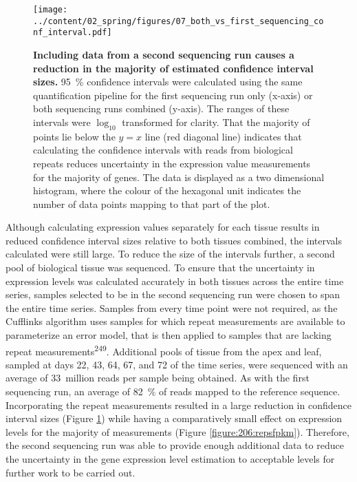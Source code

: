\documentclass[12pt,]{book}
\begin{document}
\begin{figure}[htbp]
\centering
\texttt{[image: ../content/02\_spring/figures/07\_both\_vs\_first\_sequencing\_conf\_interval.pdf]}
\caption{\textbf{Including data from a second sequencing run causes a
reduction in the majority of estimated confidence interval sizes.} 95~\%
confidence intervals were calculated using the same quantification
pipeline for the first sequencing run only (x-axis) or both sequencing
runs combined (y-axis). The ranges of these intervals were \(\log_{10}\)
transformed for clarity. That the majority of points lie below the
\(y = x\) line (red diagonal line) indicates that calculating the
confidence intervals with reads from biological repeats reduces
uncertainty in the expression value measurements for the majority of
genes. The data is displayed as a two dimensional histogram, where the
colour of the hexagonal unit indicates the number of data points mapping
to that part of the plot.}\label{figure:207:repsconf}
\end{figure}

Although calculating expression values separately for each tissue
results in reduced confidence interval sizes relative to both tissues
combined, the intervals calculated were still large. To reduce the size
of the intervals further, a second pool of biological tissue was
sequenced. To ensure that the uncertainty in expression levels was
calculated accurately in both tissues across the entire time series,
samples selected to be in the second sequencing run were chosen to span
the entire time series. Samples from every time point were not required,
as the Cufflinks algorithm uses samples for which repeat measurements
are available to parameterize an error model, that is then applied to
samples that are lacking repeat measurements\textsuperscript{249}.
Additional pools of tissue from the apex and leaf, sampled at days 22,
43, 64, 67, and 72 of the time series, were sequenced with an average of
33~million reads per sample being obtained. As with the first sequencing
run, an average of 82~\% of reads mapped to the reference sequence.
Incorporating the repeat measurements resulted in a large reduction in
confidence interval sizes (Figure \ref{figure:207:repsconf}) while
having a comparatively small effect on expression levels for the
majority of measurements (Figure \ref{figure:206:repsfpkm}). Therefore,
the second sequencing run was able to provide enough additional data to
reduce the uncertainty in the gene expression level estimation to
acceptable levels for further work to be carried out.
\end{document}
